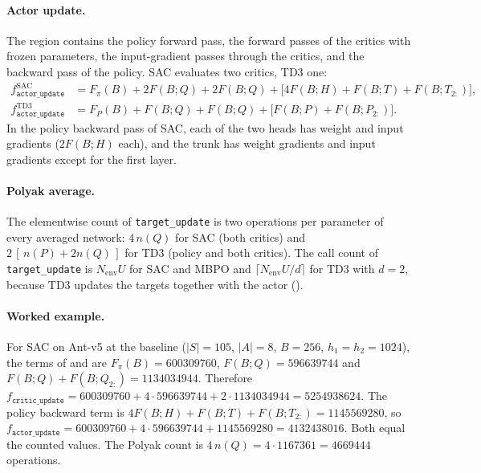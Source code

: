 \paragraph{Actor update.} The region contains the policy forward pass, the forward passes of the critics with frozen parameters, the input-gradient passes through the critics, and the backward pass of the policy.
SAC evaluates two critics, TD3 one:
\begin{align}
  f_{\texttt{actor\_update}}^{\mathrm{SAC}} &= F_\pi(B) + 2F(B;Q) + 2F(B;Q) + \bigl[4F(B;H)+F(B;T)+F(B;T_{2:})\bigr] ,\label{eq:app-actor-sac}\\
  f_{\texttt{actor\_update}}^{\mathrm{TD3}} &= F_P(B) + F(B;Q) + F(B;Q) + \bigl[F(B;P)+F(B;P_{2:})\bigr] .\label{eq:app-actor-td3}
\end{align}
In the policy backward pass of SAC, each of the two heads has weight and input gradients ($2F(B;H)$ each), and the trunk has weight gradients and input gradients except for the first layer.

\paragraph{Polyak average.} The elementwise count of \texttt{target\_update} is two operations per parameter of every averaged network: $4\,n(Q)$ for SAC (both critics) and $2\,[\,n(P)+2n(Q)\,]$ for TD3 (policy and both critics).
The call count of \texttt{target\_update} is $N_{\mathrm{env}}U$ for SAC and MBPO and $\lceil N_{\mathrm{env}}U/d\rceil$ for TD3 with $d=2$, because TD3 updates the targets together with the actor ().

\paragraph{Worked example.} For SAC on Ant-v5 at the baseline ($|S|=105$, $|A|=8$, $B=256$, $h_1=h_2=1024$), the terms of  and  are $F_\pi(B)=\num{600309760}$, $F(B;Q)=\num{596639744}$ and $F(B;Q)+F(B;Q_{2:})=\num{1134034944}$.
Therefore $f_{\texttt{critic\_update}}=\num{600309760}+4\cdot\num{596639744}+2\cdot\num{1134034944}=\num{5254938624}$.
The policy backward term is $4F(B;H)+F(B;T)+F(B;T_{2:})=\num{1145569280}$, so $f_{\texttt{actor\_update}}=\num{600309760}+4\cdot\num{596639744}+\num{1145569280}=\num{4132438016}$.
Both equal the counted values.
The Polyak count is $4\,n(Q)=4\cdot\num{1167361}=\num{4669444}$ operations.

